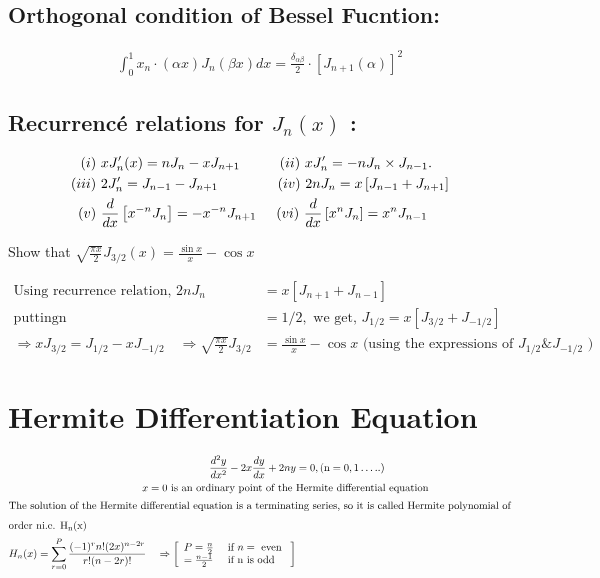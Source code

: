 \subsection{Orthogonal condition of Bessel Fucntion:}
\begin{align*}
\int_{0}^{1} x_{n} \cdot(\alpha x) J_{n}(\beta x) d x=\frac{\delta_{\alpha \beta}}{2} \cdot\left[J_{n+1}(\alpha)\right]^{2}
\end{align*}
\subsection{Recurrencé relations for $J_{n}(x)$ :}
\begin{align*}
(i)\ & x J_{n}^{\prime}(x)=n J_{n}-x J_{n+1}\hspace{1cm}(ii)\  x J_{n}^{\prime}=-n J_{n} \times J_{n-1}.\\
(iii)\ & 2 J_{n}^{\prime}=J_{n-1}-J_{n+1}\hspace{1.5cm}(iv)\  2 n J_{n}=x\left[J_{n-1}+J_{n+1}\right]\\
(v)\ & \frac{d}{d x}\left[x^{-n} J_{n}\right]=-x^{-n} J_{n+1} \hspace{.5cm} (vi)\  \frac{d}{d x}\left[x^{n} J_{n}\right]=x^{n} J_{n-1}
\end{align*}
\begin{exercise}
	Show that $\sqrt{\frac{\pi x}{2}} J_{3 / 2}(x)=\frac{\sin x}{x}-\cos x$
\end{exercise}
\begin{answer}
	\begin{align*}
	\text{Using recurrence relation, }2 n J_{n}&=x\left[J_{n+1}+J_{n-1}\right]\\
	\text{putting}\mathrm{n}&=1 / 2,\text{ we get, }J_{1 / 2}=x\left[J_{3 / 2}+J_{-1 / 2}\right]\\
	\Rightarrow x J_{3 / 2}=J_{1 / 2}-x J_{-1 / 2} \quad \Rightarrow \sqrt{\frac{\pi x}{2}} J_{3 / 2}&=\frac{\sin x}{x}-\cos x \text { (using the expressions of } J_{1 / 2} \& J_{-1 / 2} \text { ) }
	\end{align*}
\end{answer}
\section{Hermite Differentiation Equation}
\begin{align*}
\frac{d^{2} y}{d x^{2}}-2 x \frac{d y}{d x}+2 n y&=0,(\mathrm{n}=0,1 \ldots . .)\\
\text{$x=0$ is an ordinary point of the }&\text{Hermite differential equation}\\
\intertext{The solution of the Hermite differential equation is a terminating series, so it is called Hermite polynomial of}
\intertext{order ni.e. $\mathrm{H}_{\mathrm{n}}(\mathrm{x})$}
H_{n}(x)=\sum_{r=0}^{P} \frac{(-1)^{r} n !(2 x)^{n-2 r}}{r !(n-2 r) !} \quad \Rightarrow\left[\begin{array}{ll}
P=\frac{n}{2} & \text { if } n=\text { even } \\
=\frac{n-1}{2} & \text { if } \mathrm{n} \text { is odd }
\end{array}\right]
\end{align*}
